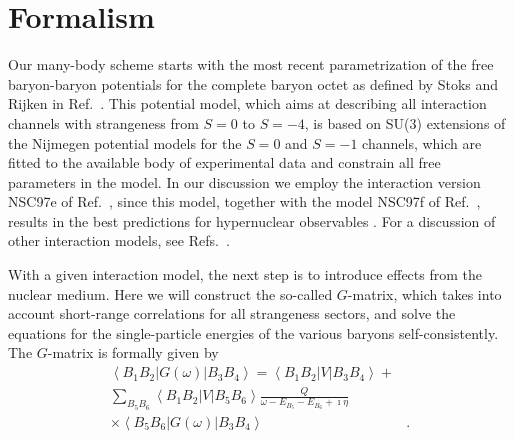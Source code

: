 \section{Formalism}
\label{sec:sec2}


Our many-body scheme starts with the most recent
parametrization
of the free baryon-baryon potentials
for the complete  baryon octet
as defined by Stoks and Rijken in Ref.\
\cite{sr99}.
This potential model, which aims at describing all
interaction channels
with strangeness from $S=0$ to $S=-4$,
is based on SU(3) extensions
of the Nijmegen potential models \cite{rsy98}
for the $S=0$ and $S=-1$ channels, which
are fitted to the available body of experimental
data and constrain all free parameters in the model.
In our discussion we employ
the interaction version NSC97e of Ref.\ \cite{sr99}, since this
model, together with the model NSC97f of Ref.\ \cite{sr99}, results in
the best predictions for hypernuclear observables \cite{rsy98}.
For a discussion of other interaction models, see Refs.\ 
\cite{sr99,sl99}.

With a given interaction model,
the next step is to introduce effects from the nuclear medium.
Here we will construct the so-called $G$-matrix, which
takes into account short-range correlations for all strangeness
sectors, and solve the equations for the single-particle energies
of the various baryons self-consistently.
The $G$-matrix is formally given by
\begin{eqnarray}
   \left\langle B_1B_2\right |G(\omega)\left | B_3B_4 \right\rangle=
   \left\langle B_1B_2\right |V\left | B_3B_4 \right\rangle+&\nonumber\\
   \sum_{B_5B_6}\left\langle B_1B_2\right |V\left | B_5B_6 \right\rangle
   \frac{Q}{\omega-E_{B_5}-E_{B_6}+ \imath\eta}&\nonumber\\
   \times\left\langle B_5B_6\right |G(\omega)\left | B_3B_4 \right\rangle&.
   \label{eq:gmatrix}
\end{eqnarray}

